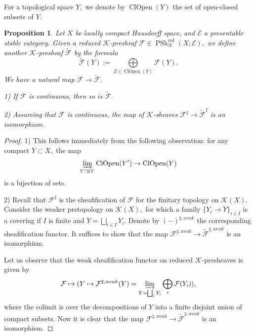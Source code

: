\documentclass[11pt,leqno]{amsart}
\newtheorem{prop}[theo]{Proposition}
\numberwithin{equation}{section}
\def\wt{\widetilde}
\newcommand{\ms}[1]{\mathscr{#1}}
\newcommand{\msK}{\ms{K}}
\newcommand{\indlim}[1][]{\mathop{\varinjlim}\limits_{#1}}
\newcommand{\biggplus}[1][]{\mathop{\bigoplus}\limits_{#1}}
\newcommand{\liminj}{\varinjlim}
\newcommand{\red}{\operatorname{red}}
\newcommand{\cF}{{\mathcal F}}
\newcommand{\cE}{{\mathcal E}}
\newcommand{\PSh}{\operatorname{PSh}}
\newcommand{\clopen}{\operatorname{ClOpen}}
\begin{document}
For a topological space $Y,$ we denote by $\clopen(Y)$ the set of open-closed subsets of $Y.$

\begin{prop}\label{prop:funny_operation} Let $X$ be locally compact Hausdorff space, and $\cE$ a presentable stable category. Given a reduced $\msK$-presheaf $\cF\in\PSh_{\msK}^{\red}(X;\cE),$ we define another $\msK$-presheaf $\wt{\cF}$ by the formula
$$\wt{\cF}(Y):=\bigoplus\limits_{Z\in \clopen(Y)}\cF(Y).$$ We have a natural map $\cF\to\wt{\cF}.$

1) If $\cF$ is continuous, then so is $\wt{\cF}.$

2) Assuming that $\cF$ is continuous, the map of $\msK$-sheaves $\cF^{\sharp}\to\wt{\cF}^{\sharp}$ is an isomorphism.\end{prop}

\begin{proof}1) This follows immediately from the following observation: for any compact $Y\subset X,$ the map
$$\liminj\limits_{Y'\Supset Y}\clopen(Y')\to\clopen(Y)$$ is a bijection of sets.

2) Recall that $\cF^{\sharp}$ is the sheafification of $\cF$ for the finitary topology on $\msK(X).$ Consider the weaker pretopology on $\msK(X),$ for which a family $\{Y_i\to Y\}_{i\in I}$ is a covering if $I$ is finite and $Y=\bigsqcup_{i\in I}Y_i.$ Denote by $(-)^{\sharp,weak}$ the corresponding sheafification functor. It suffices to show that the map $\cF^{\sharp,weak}\to\wt{\cF}^{\sharp,weak}$ is an isomorphism. 

Let us observe that the weak sheafification functor on reduced $\msK$-presheaves is given by
$$\cF\mapsto (Y\mapsto \cF^{\sharp,weak}(Y)=\indlim[Y=\bigsqcup_i Y_i]\biggplus[i]\cF(Y_i)),$$
where the colimit is over the decompositions of $Y$ into a finite disjoint union of compact subsets. Now it is clear that the map $\cF^{\sharp,weak}\to\wt{\cF}^{\sharp,weak}$ is an isomorphism.
\end{proof}
\end{document}
